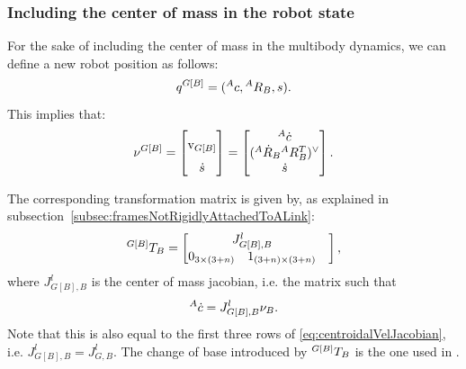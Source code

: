 \subsubsection{Including the center of mass in the robot state}
For the sake of including the center of mass in the multibody dynamics, we can define a new robot position as follows:
\begin{equation}
q^{G[B]} = (\hspace{0em}^{A}c ,\hspace{0em}^{A}R_{B},s) .
\end{equation}
This implies that:
\begin{equation}
\nu^{G[B]} 
= 
\begin{bmatrix}
 \multirow{2}{*}{$\rmv_{G[B]}$}\\
  \\
 \jointVel 
\end{bmatrix}
= 
\begin{bmatrix}
 \ls^{\inertialFrame}\dot{c} \\
 (\ls^{\inertialFrame}\dot{R}_{\bodyFrame} \ls^{\inertialFrame}{R}_{\bodyFrame}^{T})^\vee \\ 
 \jointVel 
\end{bmatrix}.
\end{equation}

The corresponding transformation matrix is given by, as explained in subsection~\ref{subsec:framesNotRigidlyAttachedToALink}: 
\begin{equation}
\ls^{G[B]} T_{B} = 
\begin{bmatrix}
\multicolumn{2}{c}{J^l_{G[B],B}} &  \\ 
0_{3 \times (3+n)} & 1_{(3+n) \times (3+n)}  
\end{bmatrix},
\end{equation}
where $J^l_{G[B],B}$ is the center of mass jacobian, i.e. the matrix such that 
\[\hspace{0em}^A \dot{c} = J^l_{G[B],B} \nu_B.\]
Note that this is also equal to the first three rows of \eqref{eq:centroidalVelJacobian}, i.e. $J^l_{G[B],B} = J^l_{G,B}$.
The change of base introduced by $\hspace{0em}^{G[B]} T_B$ is the one used in \citep{ott2011posture}.

